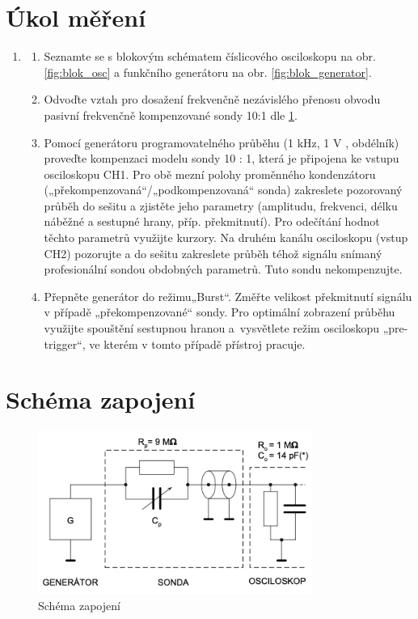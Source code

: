 \documentclass[a4paper,12pt]{article}   %
\begin{document}
\section{Úkol měření}
\label{chap:ukol}
\begin{enumerate}
    \item 
    \begin{enumerate}[label=\alph*)]
        \item Seznamte se s blokovým schématem číslicového osciloskopu na obr. \ref{fig:blok_osc} a funkčního generátoru na obr. \ref{fig:blok_generator}.
        \item  Odvoďte vztah pro dosažení frekvenčně nezávislého přenosu obvodu pasivní frekvenčně kompenzované sondy 10:1 dle \ref{fig:schema}.
        \item Pomocí generátoru programovatelného průběhu (1 kHz, 1 V , obdélník) proveďte kompenzaci modelu sondy 10 : 1, která je připojena ke vstupu osciloskopu CH1. Pro obě mezní polohy proměnného kondenzátoru („překompenzovaná“/„podkompenzovaná“ sonda) zakreslete pozorovaný průběh do sešitu a zjistěte jeho parametry (amplitudu, frekvenci, délku náběžné a sestupné hrany, příp. překmitnutí). Pro odečítání hodnot těchto parametrů využijte kurzory.
        Na druhém kanálu osciloskopu (vstup CH2) pozorujte a do sešitu zakreslete průběh téhož signálu snímaný profesionální sondou obdobných parametrů. Tuto sondu nekompenzujte.
        \item Přepněte generátor do režimu„Burst“. Změřte velikost překmitnutí signálu v případě „překompenzované“ sondy. Pro optimální zobrazení průběhu využijte spouštění sestupnou hranou a~vysvětlete režim osciloskopu „pre-trigger“, ve kterém v tomto případě přístroj pracuje.
    \end{enumerate}
\end{enumerate}


\section{Schéma zapojení}
\label{chap:schema_zapojeni}
\begin{figure}[h!]
  \centering
  \includegraphics[width = 0.8\textwidth]{schema_zapojeni.png}
  \caption{Schéma zapojení}
  \label{fig:schema}
\end{figure}
\end{document}

